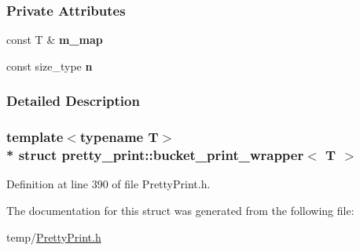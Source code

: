 \subsubsection*{Private Attributes}
\begin{DoxyCompactItemize}
\item 
const T \& {\bfseries m\+\_\+map}\hypertarget{structpretty__print_1_1bucket__print__wrapper_a884243054db0bd2f1b4db504e86bd02d}{}\label{structpretty__print_1_1bucket__print__wrapper_a884243054db0bd2f1b4db504e86bd02d}

\item 
const size\+\_\+type {\bfseries n}\hypertarget{structpretty__print_1_1bucket__print__wrapper_ac5c7a56ecc9ebe0f91a8bb77f4a77afa}{}\label{structpretty__print_1_1bucket__print__wrapper_ac5c7a56ecc9ebe0f91a8bb77f4a77afa}

\end{DoxyCompactItemize}


\subsubsection{Detailed Description}
\subsubsection*{template$<$typename T$>$\\*
struct pretty\+\_\+print\+::bucket\+\_\+print\+\_\+wrapper$<$ T $>$}



Definition at line 390 of file Pretty\+Print.\+h.



The documentation for this struct was generated from the following file\+:\begin{DoxyCompactItemize}
\item 
temp/\hyperlink{PrettyPrint_8h}{Pretty\+Print.\+h}\end{DoxyCompactItemize}
